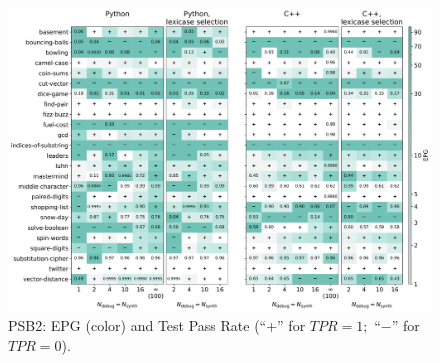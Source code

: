 \begin{figure}[H]
  \centering
  \includegraphics[width=\linewidth, trim={3mm 2.8mm 3mm 2mm}, clip]{images/epg_psb2_gpt35_01.pdf}
  \caption{PSB2: EPG (color) and Test Pass Rate (``+'' for $TPR=1;$ ``$-$'' for $TPR=0$).
  }
  \label{fig:epg-psb2}
\end{figure}

